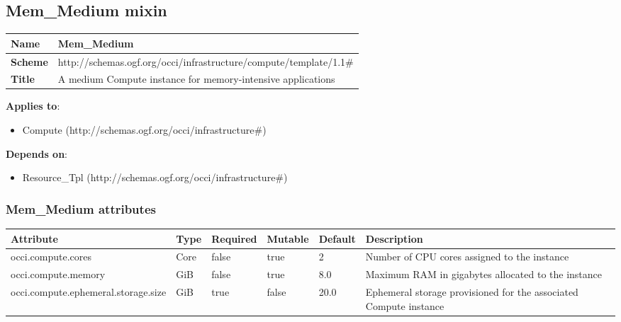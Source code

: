 \documentclass{article}
\begin{document}
\subsection{Mem\_Medium mixin}
\begin{center}
\begin{tabular}{|l|l|}
  \hline
  \textbf{Name} & Mem\_Medium \\
  \hline  
  \textbf{Scheme} & http://schemas.ogf.org/occi/infrastructure/compute/template/1.1\# \\
  \hline
  \textbf{Title} & A medium Compute instance for memory-intensive applications \\
  \hline
\end{tabular}
\end{center}
\textbf{Applies to}:
\begin{itemize}
	\item Compute (http://schemas.ogf.org/occi/infrastructure\#)
\end{itemize}
\textbf{Depends on}:
\begin{itemize}
	\item Resource\_Tpl (http://schemas.ogf.org/occi/infrastructure\#)
\end{itemize}

\subsubsection{Mem\_Medium attributes}
\begin{tabularx}{\textwidth}{|l|l|p{1.4cm}|p{1.3cm}|l|X|}
  \hline
  \textbf{Attribute} & \textbf{Type} & \textbf{Required} & \textbf{Mutable} & \textbf{Default} & \textbf{Description} \\
  \hline  
  occi.compute.cores & Core & false & true & 2 & Number of CPU cores assigned to the instance \\
  \hline
  occi.compute.memory & GiB & false & true & 8.0 & Maximum RAM in gigabytes allocated to the instance \\
  \hline
  occi.compute.ephemeral.storage.size & GiB & true & false & 20.0 & Ephemeral storage provisioned for the associated Compute instance \\
  \hline
\end{tabularx}
\end{document}
